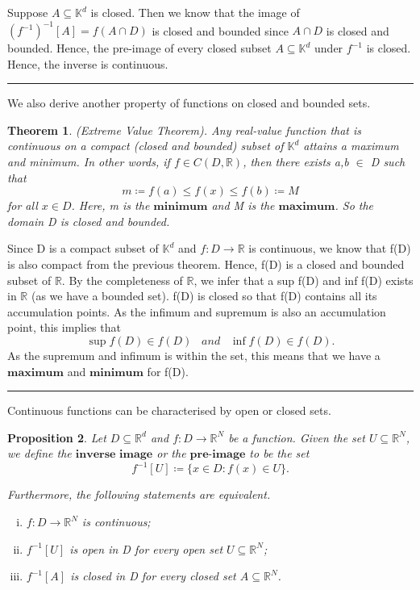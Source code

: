 \documentclass[twoside]{article}
\newcounter{lecnum}
\newtheorem{theorem}{Theorem}[lecnum]
\newtheorem{proposition}[theorem]{Proposition}
\newenvironment{proof}{{\bf Proof:}}{\hfill\rule{2mm}{2mm}}
\begin{document}
\begin{proof} Suppose $A \subseteq \mathbb{K}^d$ is closed. Then we know that the image of $(f^{-1})^{-1}[A] = f(A \cap D)$ is closed and bounded since $A \cap D$ is closed and bounded. Hence, the pre-image of every closed subset $A \subseteq \mathbb{K}^d$ under $f^{-1}$ is closed. Hence, the inverse is continuous.
\end{proof}

We also derive another property of functions on closed and bounded sets.

\begin{theorem}(Extreme Value Theorem). Any real-value function that is continuous on a compact (closed and bounded) subset of $\mathbb{K}^d$ attains a maximum and minimum. In other words, if $f \in C(D,\mathbb{R})$, then there exists a,b $\in$ D such that 
$$
m \coloneqq f(a) \leq f(x) \leq f(b) \coloneqq M
$$
for all $x \in D$. Here, m is the $\textbf{minimum}$ and M is the $\textbf{maximum}$. So the domain D is closed and bounded.
\end{theorem}

\begin{proof}
Since D is a compact subset of $\mathbb{K}^d$ and $f: D \rightarrow \mathbb{R}$ is continuous, we know that f(D) is also compact from the previous theorem. Hence, f(D) is a closed and bounded subset of $\mathbb{R}$. By the completeness of $\mathbb{R}$, we infer that a sup f(D) and inf f(D) exists in $\mathbb{R}$ (as we have a bounded set). f(D) is closed so that f(D) contains all its accumulation points. As the infimum and supremum is also an accumulation point, this implies that 
$$
\sup f(D) \in f(D) \;\;\; and \;\;\; \inf f(D) \in f(D).
$$
As the supremum and infimum is within the set, this means that we have a $\textbf{maximum}$ and $\textbf{minimum}$ for f(D).
\end{proof}

Continuous functions can be characterised by open or closed sets. 
\begin{proposition}Let $D \subseteq \mathbb{R}^d$ and $f: D \rightarrow \mathbb{R}^N$ be a function. Given the set $U \subseteq \mathbb{R}^N$, we define the $\textbf{inverse image}$ or the $\textbf{pre-image}$ to be the set
$$
f^{-1}[U] \coloneqq \{x \in D: f(x) \in U\}.
$$

Furthermore, the following statements are equivalent.
\begin{enumerate}[(i)]
  \item $f: D \rightarrow \mathbb{R}^N$ is continuous;
  \item $f^{-1}[U]$ is open in D for every open set $U \subseteq \mathbb{R}^N$;
  \item $f^{-1}[A]$ is closed in D for every closed set $A \subseteq \mathbb{R}^N$.
\end{enumerate}
\end{proposition}
\end{document}
